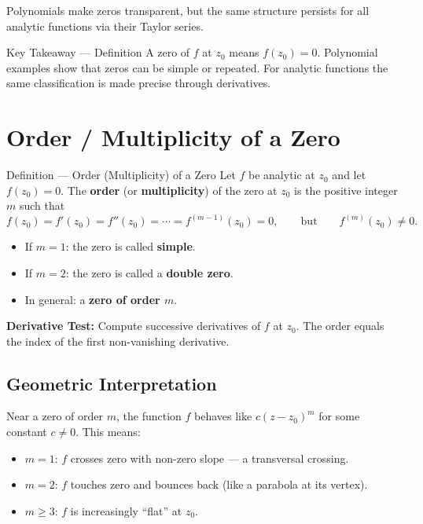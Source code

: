 \documentclass[12pt,a4paper]{article}
\begin{document}
Polynomials make zeros transparent, but the same structure persists for all analytic
functions via their Taylor series.

\begin{learnbox}{Key Takeaway --- Definition}
A zero of $f$ at $z_0$ means $f(z_0)=0$. Polynomial examples show that zeros can be simple
or repeated. For analytic functions the same classification is made precise through derivatives.
\end{learnbox}

\section{Order / Multiplicity of a Zero}

\begin{infobox}{Definition --- Order (Multiplicity) of a Zero}
Let $f$ be analytic at $z_0$ and let $f(z_0)=0$. The \textbf{order} (or \textbf{multiplicity})
of the zero at $z_0$ is the positive integer $m$ such that
\[
  f(z_0) = f'(z_0) = f''(z_0) = \cdots = f^{(m-1)}(z_0) = 0,
  \qquad \text{but} \qquad f^{(m)}(z_0) \neq 0.
\]
\begin{itemize}
  \item If $m=1$: the zero is called \textbf{simple}.
  \item If $m=2$: the zero is called a \textbf{double zero}.
  \item In general: a \textbf{zero of order $m$}.
\end{itemize}
\textbf{Derivative Test:} Compute successive derivatives of $f$ at $z_0$.
The order equals the index of the first non-vanishing derivative.
\end{infobox}

\subsection*{Geometric Interpretation}

Near a zero of order $m$, the function $f$ behaves like $c(z-z_0)^m$ for some constant
$c \neq 0$. This means:
\begin{itemize}
  \item $m=1$: $f$ crosses zero with non-zero slope --- a transversal crossing.
  \item $m=2$: $f$ touches zero and bounces back (like a parabola at its vertex).
  \item $m \geq 3$: $f$ is increasingly ``flat'' at $z_0$.
\end{itemize}
\end{document}

